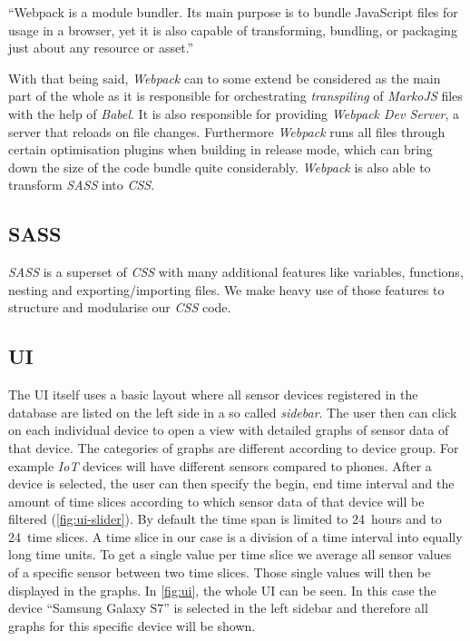 “Webpack is a module bundler. Its main purpose is to bundle JavaScript files for usage in a browser,
yet it is also capable of transforming, bundling, or packaging just about any resource or asset.”
\cite{webpack}

With that being said, \textit{Webpack} can to some extend be considered as the main part of the
whole  as it is responsible for orchestrating \textit{transpiling} of
\textit{MarkoJS} files with the help of \textit{Babel}. It is also responsible for providing
\textit{Webpack Dev Server}, a server that reloads on file changes. Furthermore \textit{Webpack}
runs all files through certain optimisation plugins when building in release mode, which can bring
down the size of the code bundle quite considerably. \textit{Webpack} is also able to transform
\textit{SASS} into \textit{CSS}.

\subsection{SASS}

\textit{SASS} \cite{sass} is a superset of \textit{CSS} with many additional features like
variables, functions, nesting and exporting/importing files. We make heavy use of those features to
structure and modularise our \textit{CSS} code.

\subsection{UI}
\label{sec:ui}

The UI itself uses a basic layout where all sensor devices registered in the database are listed on
the left side in a so called \textit{sidebar}. The user then can click on each individual device to
open a view with detailed graphs of sensor data of that device. The categories of graphs are
different according to device group. For example \textit{IoT} devices will have different sensors
compared to phones. After a device is selected, the user can then specify the begin, end time
interval and the amount of time slices according to which sensor data of that device will be
filtered (\autoref{fig:ui-slider}). By default the time span is limited to 24~hours and to 24~time
slices. A time slice in our case is a division of a time interval into equally long time units. To
get a single value per time slice we average all sensor values of a specific sensor between two time
slices. Those single values will then be displayed in the graphs. In \autoref{fig:ui}, the whole UI
can be seen. In this case the device “Samsung Galaxy S7” is selected in the left sidebar and
therefore all graphs for this specific device will be shown.

